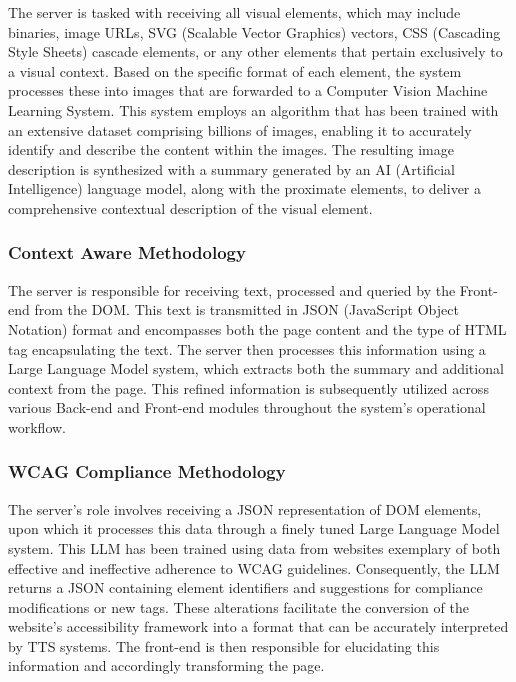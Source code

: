 \documentclass[conference]{IEEEtran}
\begin{document}
The server is tasked with receiving all visual elements, which may include binaries, image URLs, SVG (Scalable Vector Graphics) vectors, CSS (Cascading Style Sheets) cascade elements, or any other elements that pertain exclusively to a visual context. Based on the specific format of each element, the system processes these into images that are forwarded to a Computer Vision Machine Learning System. This system employs an algorithm that has been trained with an extensive dataset comprising billions of images, enabling it to accurately identify and describe the content within the images. The resulting image description is synthesized with a summary generated by an AI (Artificial Intelligence) language model, along with the proximate elements, to deliver a comprehensive contextual description of the visual element.

\subsubsection{Context Aware Methodology}

The server is responsible for receiving text, processed and queried by the Front-end from the DOM. This text is transmitted in JSON (JavaScript Object Notation) format and encompasses both the page content and the type of HTML tag encapsulating the text. The server then processes this information using a Large Language Model system, which extracts both the summary and additional context from the page. This refined information is subsequently utilized across various Back-end and Front-end modules throughout the system's operational workflow.

\subsubsection{WCAG Compliance Methodology}

The server's role involves receiving a JSON representation of DOM elements, upon which it processes this data through a finely tuned Large Language Model system. This LLM has been trained using data from websites exemplary of both effective and ineffective adherence to WCAG guidelines. Consequently, the LLM returns a JSON containing element identifiers and suggestions for compliance modifications or new tags. These alterations facilitate the conversion of the website's accessibility framework into a format that can be accurately interpreted by TTS systems. The front-end is then responsible for elucidating this information and accordingly transforming the page.
\end{document}
